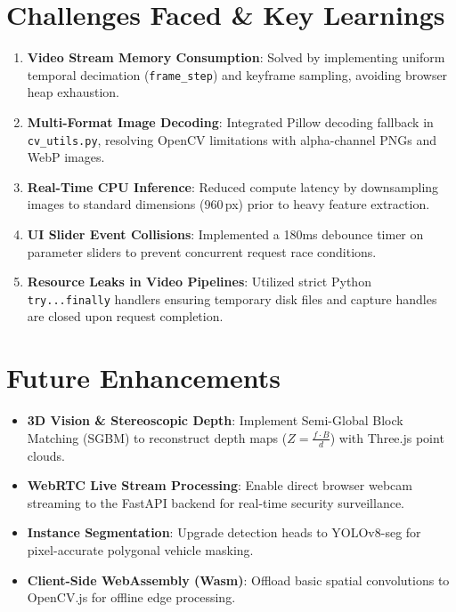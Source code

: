 \documentclass[12pt,a4paper]{article}
\begin{document}
\section{Challenges Faced \& Key Learnings}
\begin{enumerate}
    \item \textbf{Video Stream Memory Consumption}: Solved by implementing uniform temporal decimation (\texttt{frame\_step}) and keyframe sampling, avoiding browser heap exhaustion.
    \item \textbf{Multi-Format Image Decoding}: Integrated Pillow decoding fallback in \texttt{cv\_utils.py}, resolving OpenCV limitations with alpha-channel PNGs and WebP images.
    \item \textbf{Real-Time CPU Inference}: Reduced compute latency by downsampling images to standard dimensions ($960$\,px) prior to heavy feature extraction.
    \item \textbf{UI Slider Event Collisions}: Implemented a 180ms debounce timer on parameter sliders to prevent concurrent request race conditions.
    \item \textbf{Resource Leaks in Video Pipelines}: Utilized strict Python \texttt{try...finally} handlers ensuring temporary disk files and capture handles are closed upon request completion.
\end{enumerate}

\section{Future Enhancements}
\begin{itemize}
    \item \textbf{3D Vision \& Stereoscopic Depth}: Implement Semi-Global Block Matching (SGBM) to reconstruct depth maps ($Z = \frac{f \cdot B}{d}$) with Three.js point clouds.
    \item \textbf{WebRTC Live Stream Processing}: Enable direct browser webcam streaming to the FastAPI backend for real-time security surveillance.
    \item \textbf{Instance Segmentation}: Upgrade detection heads to YOLOv8-seg for pixel-accurate polygonal vehicle masking.
    \item \textbf{Client-Side WebAssembly (Wasm)}: Offload basic spatial convolutions to OpenCV.js for offline edge processing.
\end{itemize}
\end{document}

